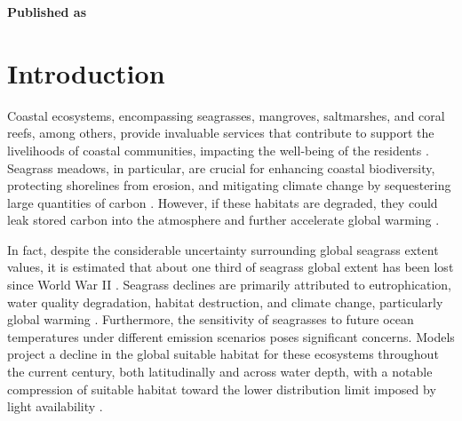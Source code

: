\vspace{3cm}





\textbf{Published as}

\vspace{0.5cm}


\newpage
\section{Introduction}

Coastal ecosystems, encompassing seagrasses, mangroves, saltmarshes, and coral
reefs, among others, provide invaluable services that contribute to support the
livelihoods of coastal communities, impacting the well-being of the residents
\cite{MEA2005,IUCN2008}. Seagrass meadows, in particular, are crucial for
enhancing coastal biodiversity, protecting shorelines from erosion, and
mitigating climate change by sequestering large quantities of carbon
\cite{DuarteNCC2013,Mcleod2011}. However, if these habitats are degraded, they
could leak stored carbon into the atmosphere and further accelerate global
warming \cite{DuarteNCC2013,Macreadie2014}.

In fact, despite the considerable uncertainty surrounding global seagrass
extent values, it is estimated that about one third of seagrass global extent
has been lost since World War II \cite{DuarteNCC2013}. Seagrass declines are
primarily attributed to eutrophication, water quality degradation, habitat
destruction, and climate change, particularly global warming
\cite{Waycott2009}. Furthermore, the
sensitivity of seagrasses to future ocean temperatures under different emission
scenarios poses significant concerns. Models project a decline in the global
suitable habitat for these ecosystems throughout the current century, both
latitudinally and across water depth, with a notable compression of suitable
habitat toward the lower distribution limit imposed by light availability
\cite{Jorda2020}.

